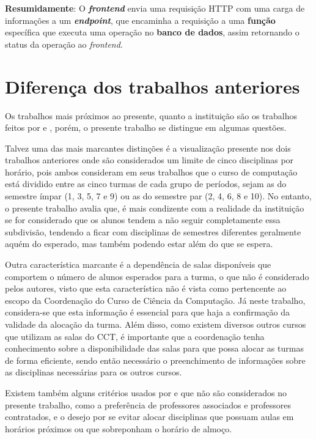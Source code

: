\textbf{Resumidamente}: O \textbf{\textit{frontend}} envia uma requisição HTTP com uma carga de informações a um \textbf{\textit{endpoint}}, que encaminha a requisição a uma \textbf{função} específica que executa uma operação no \textbf{banco de dados}, assim retornando o status da operação ao \textit{frontend}.

\section{Diferença dos trabalhos anteriores} \label{sec:diferenca} %

Os trabalhos mais próximos ao presente, quanto a instituição são os trabalhos feitos por  e , porém, o presente trabalho se distingue em algumas questões.

Talvez uma das mais marcantes distinções é a visualização presente nos dois trabalhos anteriores onde são considerados um limite de cinco disciplinas por horário, pois ambos consideram em seus trabalhos que o curso de computação está dividido entre as cinco turmas de cada grupo de períodos, sejam as do semestre ímpar (1, 3, 5, 7 e 9) ou as do semestre par (2, 4, 6, 8 e 10). No entanto, o presente trabalho avalia que, é mais condizente com a realidade da instituição se for considerado que os alunos tendem a não seguir completamente essa subdivisão, tendendo a ficar com disciplinas de semestres diferentes geralmente aquém do esperado, mas também podendo estar além do que se espera.

Outra característica marcante é a dependência de salas disponíveis que comportem o número de alunos esperados para a turma, o que não é considerado pelos autores, visto que esta característica não é vista como pertencente ao escopo da Coordenação do Curso de Ciência da Computação. Já neste trabalho, considera-se que esta informação é essencial para que haja a confirmação da validade da alocação da turma. Além disso, como existem diversos outros cursos que utilizam as salas do CCT, é importante que a coordenação tenha conhecimento sobre a disponibilidade das salas para que possa alocar as turmas de forma eficiente, sendo então necessário o preenchimento de informações sobre as disciplinas necessárias para os outros cursos.

Existem também alguns critérios usados por  e  que não são considerados no presente trabalho, como a preferência de professores associados e professores contratados, e o desejo por se evitar alocar disciplinas que possuam aulas em horários próximos ou que sobreponham o horário de almoço.
